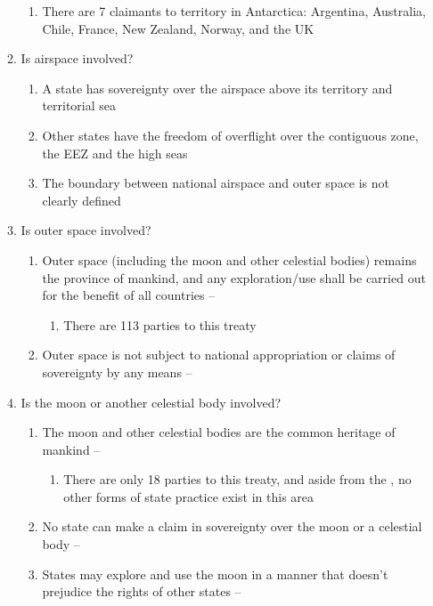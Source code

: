 \begin{enumerate}
\begin{enumerate}
\begin{enumerate}
            \item There are 7 claimants to territory in Antarctica: Argentina, Australia, Chile, France, New Zealand, Norway, and the UK
        \end{enumerate}
        \item Is airspace involved?
        \begin{enumerate}
            \item A state has sovereignty over the airspace above its territory and territorial sea
            \item Other states have the freedom of overflight over the contiguous zone, the EEZ and the high seas
            \item The boundary between national airspace and outer space is not clearly defined
        \end{enumerate}
        \item Is outer space involved?
        \begin{enumerate}
            \item Outer space (including the moon and other celestial bodies) remains the province of mankind, and any exploration/use shall be carried out for the benefit of all countries -- 
            \begin{enumerate}
                \item There are 113 parties to this treaty
            \end{enumerate}
            \item Outer space is not subject to national appropriation or claims of sovereignty by any means -- 
        \end{enumerate}
        \item Is the moon or another celestial body involved?
        \begin{enumerate}
            \item The moon and other celestial bodies are the common heritage of mankind -- 
            \begin{enumerate}
                \item There are only 18 parties to this treaty, and aside from the , no other forms of state practice exist in this area
            \end{enumerate}
            \item No state can make a claim in sovereignty over the moon or a celestial body -- 
            \item States may explore and use the moon in a manner that doesn't prejudice the rights of other states -- 
        \end{enumerate}
    \end{enumerate}
\end{enumerate}

